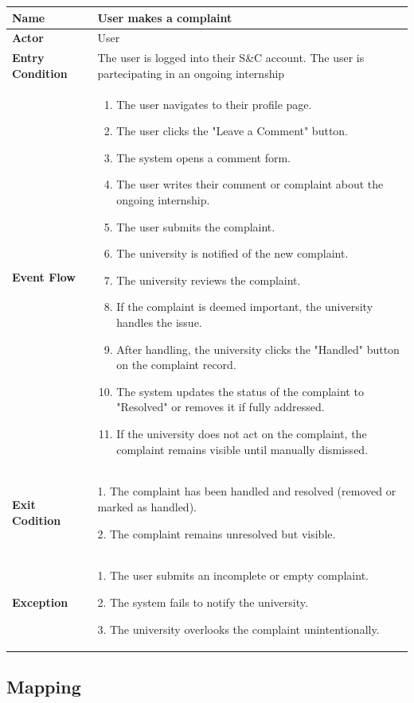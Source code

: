\begin{longtable}{|p{}|p{}|}
\hline
\textbf{Name} &  User makes a complaint\\
\hline
\textbf{Actor} &  User\\
\hline
\textbf{Entry Condition} &  The user is logged into their S\&C account. The user is partecipating in an ongoing internship\\
\hline
\textbf{Event Flow} &  
\begin{enumerate}
    \item The user navigates to their profile page.
    \item The user clicks the "Leave a Comment" button.
    \item The system opens a comment form.
    \item The user writes their comment or complaint about the ongoing internship.
    \item The user submits the complaint.
    \item The university is notified of the new complaint.
    \item The university reviews the complaint.
    \item If the complaint is deemed important, the university handles the issue.
    \item After handling, the university clicks the "Handled" button on the complaint record.
    \item The system updates the status of the complaint to "Resolved" or removes it if fully addressed.
    \item If the university does not act on the complaint, the complaint remains visible until manually dismissed.
\end{enumerate}
\\
\hline
\textbf{Exit Codition} & 
1. The complaint has been handled and resolved (removed or marked as handled).

2. The complaint remains unresolved but visible.\\
\hline
\textbf{Exception} &
1. The user submits an incomplete or empty complaint.

2. The system fails to notify the university.

3. The university overlooks the complaint unintentionally.\\
\hline
\end{longtable}

\subsection{Mapping}



